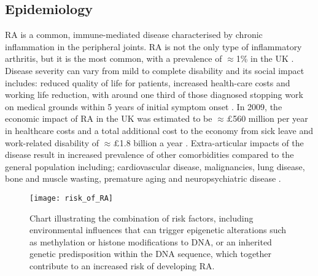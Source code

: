 \documentclass[twoside]{bhamthesis}
\theoremstyle{definition}
\begin{document}
\subsection{Epidemiology}

RA is a common, immune-mediated disease characterised by chronic inflammation in the peripheral joints. RA is not the only type of inflammatory arthritis, but it is the most common, with a prevalence of $\approx$1\% in the UK \cite{suresh2004diagnosis}. Disease severity can vary from mild to complete disability and its social impact includes: reduced quality of life for patients, increased health-care costs and working life reduction, with around one third of those diagnosed stopping work on medical grounds within 5 years of initial symptom onset \cite{barrett2000impact}. In 2009, the economic impact of RA in the UK was estimated to be $\approx\pounds$560 million per year in healthcare costs and a total additional cost to the economy from sick leave and work-related disability of $\approx\pounds$1.8 billion a year \cite{national2009services}. Extra-articular impacts of the disease result in increased prevalence of other comorbidities compared to the general population including; cardiovascular disease, malignancies, lung disease, bone and muscle wasting, premature aging and neuropsychiatric disease \cite{van2016challenging,turesson2003extra}.

\begin{figure}[!ht]
\centering\texttt{[image: risk\_of\_RA]}
\caption{Chart illustrating the combination of risk factors, including environmental influences that can trigger epigenetic  alterations such as methylation or histone modifications to DNA, or an inherited genetic predisposition within the DNA sequence, which together contribute to an increased risk of developing RA.}
\label{fig:risk_of_RA}
\end{figure}
\end{document}
